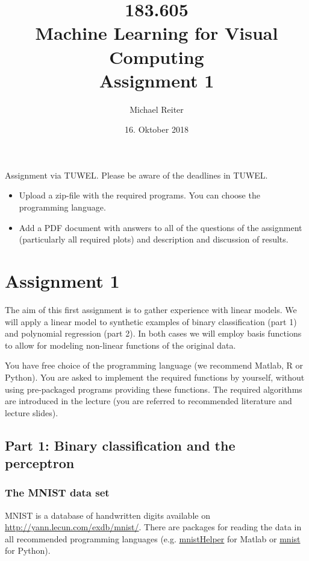\documentclass[a4]{article}
\title{\bf 183.605 \\ Machine Learning for Visual Computing \\ Assignment 1}
\author{Michael Reiter}
\date{16. Oktober 2018}
\begin{document}
\maketitle
\noindent
Assignment via TUWEL. Please be aware of the deadlines in TUWEL. \\
\begin{itemize}
\item Upload a zip-file with the required programs. You can choose the programming language.
\item Add a PDF document with answers to all of the questions of the assignment (particularly all required plots) and description and discussion of results. 
\end{itemize}

\section{Assignment 1}

The aim of this first assignment is to gather experience with linear models. We will apply a linear model to synthetic examples of binary classification (part 1) and polynomial regression (part 2). In both cases we will employ basis functions to allow for modeling non-linear functions of the original data.

You have free choice of the programming language (we recommend Matlab, R or Python).
You are asked to implement the required functions by yourself, without using pre-packaged programs  providing these functions. The required algorithms are introduced in the lecture (you are referred to recommended literature and lecture slides).

\newpage
\subsection{Part 1: Binary classification and the perceptron}

\subsubsection{The MNIST data set}\label{sec:readdata}

MNIST is a database of handwritten digits available on \url{http://yann.lecun.com/exdb/mnist/}. There are packages for reading the data in all recommended programming languages (e.g. \href{http://ufldl.stanford.edu/wiki/index.php/Using_the_MNIST_Dataset}{mnistHelper} for Matlab or \href{https://github.com/datapythonista/mnist}{mnist} for Python).
\vspace{0.5cm}
\end{document}
